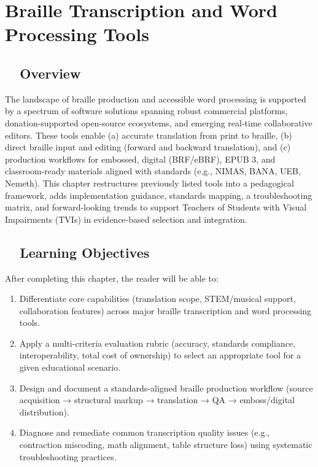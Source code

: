 \chapter{Braille Transcription and Word Processing Tools}\label{ch12:braille-transcription}


\section{~~Overview}\label{ch12:sec:introduction}
The landscape of braille production and accessible word processing is supported by a spectrum of software solutions spanning robust commercial platforms, donation-supported open-source ecosystems, and emerging real‑time collaborative editors. These tools enable (a) accurate translation from print to \gls{braille}, (b) direct braille input and editing (forward and backward translation), and (c) production workflows for embossed, digital (BRF/eBRF), EPUB 3, and classroom-ready materials aligned with standards (e.g., NIMAS, BANA, UEB, Nemeth). This chapter restructures previously listed tools into a pedagogical framework, adds implementation guidance, standards mapping, a troubleshooting matrix, and forward-looking trends to support Teachers of Students with Visual Impairments (TVIs) in evidence‑based selection and integration.

\section{~~Learning Objectives}\label{ch12:sec:learning-objectives}
After completing this chapter, the reader will be able to:
\begin{enumerate}
	\item Differentiate core capabilities (translation scope, STEM/musical support, collaboration features) across major braille transcription and word processing tools.
	\item Apply a multi-criteria evaluation rubric (accuracy, standards compliance, interoperability, total cost of ownership) to select an appropriate tool for a given educational scenario.
	\item Design and document a standards-aligned braille production workflow (source acquisition → structural markup → translation → QA → emboss/digital distribution).
	\item Diagnose and remediate common transcription quality issues (e.g., contraction miscoding, math alignment, table structure loss) using systematic troubleshooting practices.
\end{enumerate}

